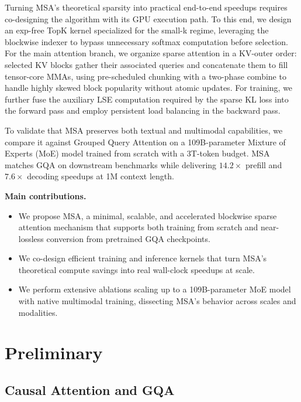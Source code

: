 \documentclass{llmxive}
\begin{document}
Turning MSA's theoretical sparsity into practical end-to-end speedups requires co-designing the algorithm with its GPU execution path. To this end, we design an exp-free TopK kernel specialized for the small-k regime, leveraging the blockwise indexer to bypass unnecessary softmax computation before selection. For the main attention branch, we organize sparse attention in a KV-outer order: selected KV blocks gather their associated queries and concatenate them to fill tensor-core MMAs, using pre-scheduled chunking with a two-phase combine to handle highly skewed block popularity without atomic updates. For training, we further fuse the auxiliary LSE computation required by the sparse KL loss into the forward pass and employ persistent load balancing in the backward pass. 

To validate that MSA preserves both textual and multimodal capabilities, we compare it against Grouped Query Attention on a 109B-parameter Mixture of Experts (MoE) model trained from scratch with a 3T-token budget. MSA matches GQA on downstream benchmarks while delivering $14.2\times$ prefill and $7.6\times$ decoding speedups at 1M context length.



\noindent \textbf{Main contributions.} 
\begin{itemize}[itemsep=6pt]
    \item We propose MSA, a minimal, scalable, and accelerated blockwise sparse attention mechanism that supports both training from scratch and near-lossless conversion from pretrained GQA checkpoints.

    \item We co-design efficient training and inference kernels that turn MSA's theoretical compute savings into real wall-clock speedups at scale.

    \item We perform extensive ablations scaling up to a 109B-parameter MoE model with native multimodal training, dissecting MSA's behavior across scales and modalities.
\end{itemize}

\section{Preliminary}
\label{sec:preliminary}

\subsection{Causal Attention and GQA}
\label{sec:preliminary-attention-gqa}
\end{document}
